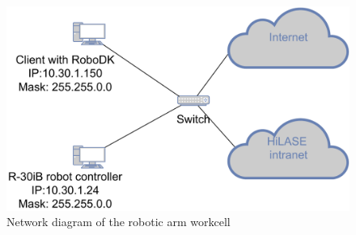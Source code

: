 \begin{figure}[h]
    \centering
    \includegraphics[width=0.8\linewidth]{img/network.pdf}
    \caption{Network diagram of the robotic arm workcell}
    \label{fig:network}
\end{figure}

